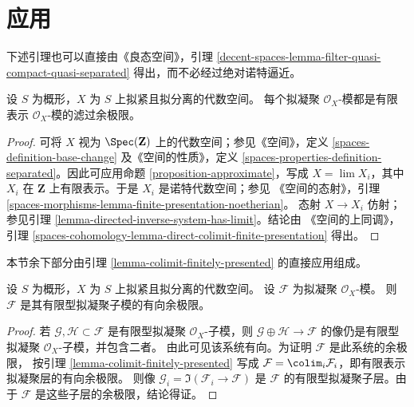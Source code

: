 \section{应用}
\label{section-applications}

\noindent
下述引理也可以直接由《良态空间》，引理
\ref{decent-spaces-lemma-filter-quasi-compact-quasi-separated}
得出，而不必经过绝对诺特逼近。

\begin{lemma}
\label{lemma-colimit-finitely-presented}
设 $S$ 为概形，$X$ 为 $S$ 上拟紧且拟分离的代数空间。
每个拟凝聚 $\mathcal{O}_X$-模都是有限表示
$\mathcal{O}_X$-模的滤过余极限。
\end{lemma}

\begin{proof}
可将 $X$ 视为 $\Spec(\mathbf{Z})$ 上的代数空间；参见《空间》，定义
\ref{spaces-definition-base-change} 及《空间的性质》，定义
\ref{spaces-properties-definition-separated}。因此可应用命题
\ref{proposition-approximate}，写成 $X = \lim X_i$，其中 $X_i$
在 $\mathbf{Z}$ 上有限表示。于是 $X_i$ 是诺特代数空间；参见
《空间的态射》，引理
\ref{spaces-morphisms-lemma-finite-presentation-noetherian}。
态射 $X \to X_i$ 仿射；参见引理
\ref{lemma-directed-inverse-system-has-limit}。结论由
《空间的上同调》，引理
\ref{spaces-cohomology-lemma-direct-colimit-finite-presentation} 得出。
\end{proof}

\noindent
本节余下部分由引理 \ref{lemma-colimit-finitely-presented} 的直接应用组成。

\begin{lemma}
\label{lemma-directed-colimit-finite-type}
设 $S$ 为概形，$X$ 为 $S$ 上拟紧且拟分离的代数空间。
设 $\mathcal{F}$ 为拟凝聚 $\mathcal{O}_X$-模。
则 $\mathcal{F}$ 是其有限型拟凝聚子模的有向余极限。
\end{lemma}

\begin{proof}
若 $\mathcal{G},\mathcal{H} \subset \mathcal{F}$ 是有限型拟凝聚
$\mathcal{O}_X$-子模，则 $\mathcal{G} \oplus \mathcal{H} \to \mathcal{F}$
的像仍是有限型拟凝聚 $\mathcal{O}_X$-子模，并包含二者。
由此可见该系统有向。为证明 $\mathcal{F}$ 是此系统的余极限，
按引理 \ref{lemma-colimit-finitely-presented} 写成
$\mathcal{F} = \colim_i \mathcal{F}_i$，即有限表示拟凝聚层的有向余极限。
则像 $\mathcal{G}_i = \Im(\mathcal{F}_i \to \mathcal{F})$
是 $\mathcal{F}$ 的有限型拟凝聚子层。由于 $\mathcal{F}$
是这些子层的余极限，结论得证。
\end{proof}


